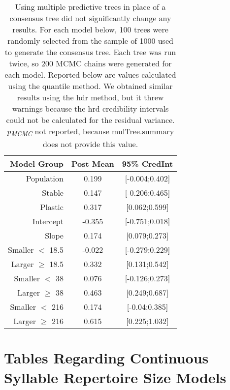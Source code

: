 \documentclass{article}
\begin{document}
  
  \begin{table}[ht]
  \centering
  \caption{Using multiple predictive trees in place of a consensus tree did not significantly change any results.  For each model below, 100 trees were randomly selected from the sample of 1000 used to generate the consensus tree.  Each tree was run twice, so 200 MCMC chains were generated for each model.  Reported below are values calculated using the quantile method.  We obtained similar results using the hdr method, but it threw warnings because the hrd credibility intervals could not be calculated for the residual variance. \textit{p\textsubscript{MCMC}} not reported, because mulTree.summary does not provide this value.}
  \begin{tabular}{rcc}
  \hline
  Model Group & Post Mean & 95\% CredInt \\ 
  \hline
  Population & 0.199 & [-0.004;0.402] \\ \hdashline
  Stable & 0.147 & [-0.206;0.465] \\ 
  Plastic & 0.317 & [0.062;0.599] \\ \hdashline
  Intercept & -0.355 & [-0.751;0.018] \\ 
  Slope & 0.174 & [0.079;0.273] \\ \hdashline
  Smaller $<$ 18.5 & -0.022 & [-0.279;0.229] \\ 
  Larger $\ge$ 18.5 & 0.332 & [0.131;0.542] \\\hdashline 
  Smaller $<$ 38 & 0.076 & [-0.126;0.273] \\ 
  Larger $\ge$ 38 & 0.463 & [0.249;0.687] \\ \hdashline
  Smaller $<$ 216 & 0.174 & [-0.04;0.385] \\ 
  Larger $\ge$ 216 & 0.615 & [0.225;1.032] \\ 
  \hline
  \end{tabular}
  \end{table}
  
  
  
  \section{Tables Regarding Continuous Syllable Repertoire Size Models}
  
\end{document}
